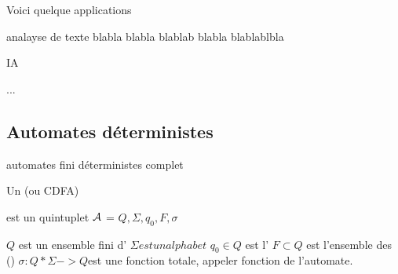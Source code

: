     Voici quelque applications
    
    \begin{enumerate}
        \itt analayse de texte 
        \itt blabla  blabla 
        \itt blablab blabla 
        \itt blablablbla
        
        \itt IA 
        
        \itt ...
        
    \end{enumerate}
    
    \subsection{Automates déterministes}
    
    \begin{definition}{automates fini déterministes complet}{}
        
        Un  (ou CDFA) 
        
        est un quintuplet $\mathcal{A}$ = $Q,\Sigma, q_0, F, \sigma$
        \begin{enumerate}
            \itt $Q$ est un ensemble fini d'
            \itt $\Sigma est un alphabet$
            \itt $q_0 \in Q$ est l'
            \itt $F \subset Q$ est l'ensemble des  ()
            \itt $\sigma :  Q  *  \Sigma -> Q $est une fonction totale, appeler fonction de l'automate.   
        
        \end{enumerate}
    
    \end{definition}
    
